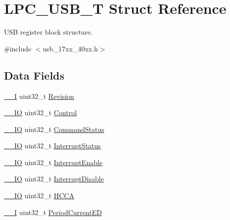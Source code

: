 \hypertarget{structLPC__USB__T}{\section{L\-P\-C\-\_\-\-U\-S\-B\-\_\-\-T Struct Reference}
\label{structLPC__USB__T}
}


U\-S\-B register block structure.  




{\ttfamily \#include $<$usb\-\_\-17xx\-\_\-40xx.\-h$>$}

\subsection*{Data Fields}
\begin{DoxyCompactItemize}
\item 
\hyperlink{core__cm3_8h_af63697ed9952cc71e1225efe205f6cd3}{\-\_\-\-\_\-\-I} uint32\-\_\-t \hyperlink{structLPC__USB__T_aa3eac0d60e5474925416501b67c27936}{Revision}
\item 
\hyperlink{core__cm3_8h_aec43007d9998a0a0e01faede4133d6be}{\-\_\-\-\_\-\-I\-O} uint32\-\_\-t \hyperlink{structLPC__USB__T_a01563d891695a6ebce006b7e9a97d631}{Control}
\item 
\hyperlink{core__cm3_8h_aec43007d9998a0a0e01faede4133d6be}{\-\_\-\-\_\-\-I\-O} uint32\-\_\-t \hyperlink{structLPC__USB__T_a5f3bd378763d0743ce57e6addf75e81d}{Command\-Status}
\item 
\hyperlink{core__cm3_8h_aec43007d9998a0a0e01faede4133d6be}{\-\_\-\-\_\-\-I\-O} uint32\-\_\-t \hyperlink{structLPC__USB__T_a1d1387bdd1f39c2120a2d272c46b6b02}{Interrupt\-Status}
\item 
\hyperlink{core__cm3_8h_aec43007d9998a0a0e01faede4133d6be}{\-\_\-\-\_\-\-I\-O} uint32\-\_\-t \hyperlink{structLPC__USB__T_af40ec2849ec75a04f582ae55a9822540}{Interrupt\-Enable}
\item 
\hyperlink{core__cm3_8h_aec43007d9998a0a0e01faede4133d6be}{\-\_\-\-\_\-\-I\-O} uint32\-\_\-t \hyperlink{structLPC__USB__T_add213a230e4bde47f6bc929bf64a5517}{Interrupt\-Disable}
\item 
\hyperlink{core__cm3_8h_aec43007d9998a0a0e01faede4133d6be}{\-\_\-\-\_\-\-I\-O} uint32\-\_\-t \hyperlink{structLPC__USB__T_a364bfe1806304b2ec92709a0ee24942d}{H\-C\-C\-A}
\item 
\hyperlink{core__cm3_8h_af63697ed9952cc71e1225efe205f6cd3}{\-\_\-\-\_\-\-I} uint32\-\_\-t \hyperlink{structLPC__USB__T_ac160f7c461c044798d0fe75a3e3f6703}{Period\-Current\-E\-D}

\end{DoxyCompactItemize}
